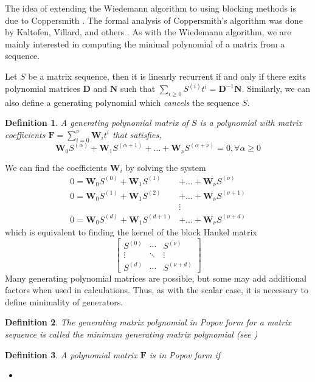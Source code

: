 \documentclass[12pt]{article}
\newtheorem{definition}{Definition}
\def\mD{\mathbf{D}}
\def\mF{\mathbf{F}}
\def\mN{\mathbf{N}}
\def\mW{\mathbf{W}}
\begin{document}
The idea of extending the Wiedemann algorithm to using
blocking methods is due to Coppersmith \cite{Coppersmith93}.
The formal analysis of Coppersmith's algorithm was done by
Kaltofen, Villard, and others \cite{KaVi04}\cite{Villard97}.
As with the Wiedemann algorithm, we are mainly interested in
computing the minimal polynomial of a matrix from a sequence.

Let $S$ be a matrix sequence, then it is linearly recurrent
if and only if there exits polynomial matrices $\mD$ and $\mN$ such 
that $\sum_{i \ge 0} S^{(i)}t^i = \mD^{-1} \mN$.
Similarly, we can also define a generating polynomial which
\textit{cancels} the sequence $S$.

\begin{definition}
	A generating polynomial matrix of $S$ is 
	a polynomial with matrix coefficients
	$\mF = \sum^{\nu}_{i=0} \mW_i t^i $ that satisfies,
	$$ \mW_0 S^{(\alpha)} + \mW_1 S^{(\alpha+1)} + \dots + \mW_\nu S^{(\alpha+\nu)}  = 0, \forall \alpha \ge 0$$ 
\end{definition}
We can find the coefficients $\mW_i$ by solving the system
\begin{align*}
	0 = \mW_0 S^{(0)} + \mW_1 S^{(1)} &+ \dots + \mW_\nu S^{(\nu)}   \\
	0 = \mW_0 S^{(1)} + \mW_1 S^{(2)} &+ \dots + \mW_\nu S^{(\nu+1)} \\
	&\vdots \\
	0 = \mW_0 S^{(d)} + \mW_1 S^{(d+1)} &+ \dots + \mW_\nu S^{(\nu+d)}
\end{align*}
which is equivalent to finding the kernel of the block Hankel
matrix
$$ \begin{bmatrix}
S^{(0)} & \cdots & S^{(\nu)}\\
\vdots & \ddots & \vdots\\
S^{(d)} & \cdots & S^{(\nu + d)}
\end{bmatrix}$$
Many generating polynomial matrices are possible, but some
may add additional factors when used in calculations.
Thus, as with the scalar case, it is necessary to define
minimality of generators.

\begin{definition}
	The generating matrix polynomial in Popov form
	for a matrix sequence is called
	the minimum generating matrix polynomial (see
	\cite[definition 2.3]{KaVi04})
\end{definition}

\begin{definition}
	A polynomial matrix $\mF$ is in Popov form if
	\begin{itemize}
		\item 
	\end{itemize}
\end{definition}
\end{document}
